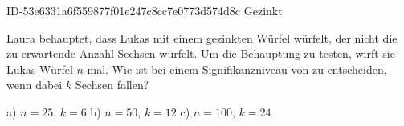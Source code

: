 \begin{exercise}
      {ID-53e6331a6f559877f01e247c8cc7e0773d574d8c}
      {Gezinkt}
  \ifproblem\problem\par
    Laura behauptet, dass Lukas mit einem gezinkten Würfel würfelt, der nicht
    die zu erwartende Anzahl Sechsen würfelt. Um die Behauptung zu testen,
    wirft sie Lukas Würfel $n$-mal. Wie ist bei einem Signifikanzniveau von
     zu entscheiden, wenn dabei $k$ Sechsen fallen?
    \begin{center}
      a) $n=25$, $k=6$
      \qquad\qquad
      b) $n=50$, $k=12$
      \qquad\qquad
      c) $n=100$, $k=24$
    \end{center}
  \fi
\end{exercise}
